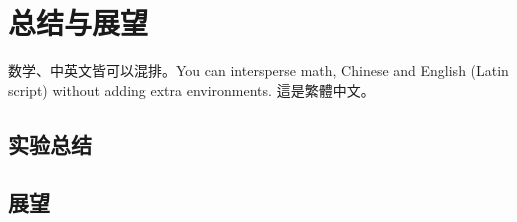 \section{总结与展望}
\songti
数学、中英文皆可以混排。You can intersperse math, Chinese and English (Latin script) without adding extra environments.
這是繁體中文。


\subsection{实验总结}


\subsection{展望}